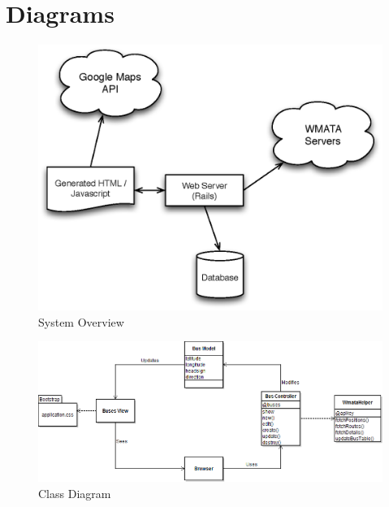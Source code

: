 \documentclass[12pt]{article}
\begin{document}
\section*{Diagrams}

\begin{figure}[h]
  \caption{System Overview}
  \centering
    \includegraphics[width=1.0\textwidth]{design.eps}
\end{figure}

\begin{figure}[h]
  \caption{Class Diagram}
  \centering
    \includegraphics[width=1.0\textwidth]{busTrackerUML.png}
\end{figure}
\end{document}
